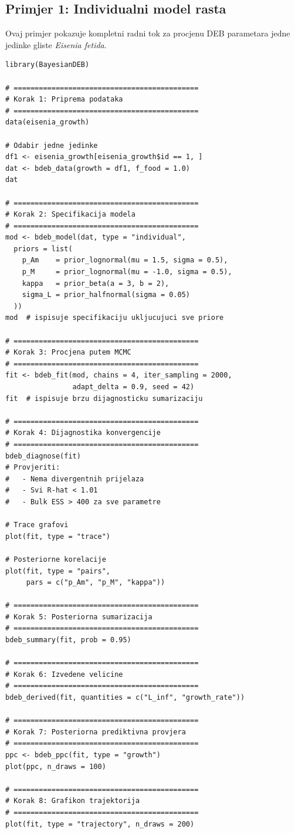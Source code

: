 \documentclass[11pt,a4paper]{article}
\begin{document}
\subsection{Primjer 1: Individualni model rasta}
\label{sec:primjer-individual}

Ovaj primjer pokazuje kompletni radni tok za procjenu DEB parametara
jedne jedinke gliste \textit{Eisenia fetida}.

\begin{lstlisting}
library(BayesianDEB)

# ============================================
# Korak 1: Priprema podataka
# ============================================
data(eisenia_growth)

# Odabir jedne jedinke
df1 <- eisenia_growth[eisenia_growth$id == 1, ]
dat <- bdeb_data(growth = df1, f_food = 1.0)
dat

# ============================================
# Korak 2: Specifikacija modela
# ============================================
mod <- bdeb_model(dat, type = "individual",
  priors = list(
    p_Am    = prior_lognormal(mu = 1.5, sigma = 0.5),
    p_M     = prior_lognormal(mu = -1.0, sigma = 0.5),
    kappa   = prior_beta(a = 3, b = 2),
    sigma_L = prior_halfnormal(sigma = 0.05)
  ))
mod  # ispisuje specifikaciju ukljucujuci sve priore

# ============================================
# Korak 3: Procjena putem MCMC
# ============================================
fit <- bdeb_fit(mod, chains = 4, iter_sampling = 2000,
                adapt_delta = 0.9, seed = 42)
fit  # ispisuje brzu dijagnosticku sumarizaciju

# ============================================
# Korak 4: Dijagnostika konvergencije
# ============================================
bdeb_diagnose(fit)
# Provjeriti:
#   - Nema divergentnih prijelaza
#   - Svi R-hat < 1.01
#   - Bulk ESS > 400 za sve parametre

# Trace grafovi
plot(fit, type = "trace")

# Posteriorne korelacije
plot(fit, type = "pairs",
     pars = c("p_Am", "p_M", "kappa"))

# ============================================
# Korak 5: Posteriorna sumarizacija
# ============================================
bdeb_summary(fit, prob = 0.95)

# ============================================
# Korak 6: Izvedene velicine
# ============================================
bdeb_derived(fit, quantities = c("L_inf", "growth_rate"))

# ============================================
# Korak 7: Posteriorna prediktivna provjera
# ============================================
ppc <- bdeb_ppc(fit, type = "growth")
plot(ppc, n_draws = 100)

# ============================================
# Korak 8: Grafikon trajektorija
# ============================================
plot(fit, type = "trajectory", n_draws = 200)
\end{lstlisting}
\end{document}

